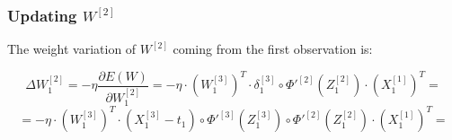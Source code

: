 \documentclass{article}
\begin{document}
\subsubsection*{Updating $W^{[2]}$}

The weight variation of $W^{[2]}$ coming from the first observation is:

\[ \Delta W^{[2]}_1 = - \eta \frac{\partial E(W)}{\partial W^{[2]}_1} = - \eta \cdot (W^{[3]}_1)^T \cdot \delta^{[3]}_1 \circ \Phi'^{[2]}(Z^{[2]}_1)\cdot (X^{[1]}_1)^T = \]
\[ = - \eta \cdot (W^{[3]}_1)^T \cdot (X^{[3]}_1 - t_1) \circ \Phi'^{[3]}(Z^{[3]}_1) \circ \Phi'^{[2]}(Z^{[2]}_1) \cdot (X^{[1]}_1)^T = \]
\[\]
\end{document}
